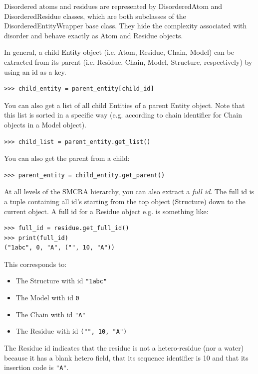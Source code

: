 Disordered atoms and residues are represented by DisorderedAtom and DisorderedResidue
classes, which are both subclasses of the DisorderedEntityWrapper base class.
They hide the complexity associated with disorder and behave exactly as Atom
and Residue objects.

In general, a child Entity object (i.e. Atom, Residue, Chain, Model) can be
extracted from its parent (i.e. Residue, Chain, Model, Structure, respectively)
by using an id as a key.

\begin{verbatim}
>>> child_entity = parent_entity[child_id]
\end{verbatim}

You can also get a list of all child Entities of a parent Entity object. Note
that this list is sorted in a specific way (e.g. according to chain identifier
for Chain objects in a Model object).

\begin{verbatim}
>>> child_list = parent_entity.get_list()
\end{verbatim}

You can also get the parent from a child:
\begin{verbatim}
>>> parent_entity = child_entity.get_parent()
\end{verbatim}

At all levels of the SMCRA hierarchy, you can also extract a \emph{full id}.
The full id is a tuple containing all id's starting from the top object (Structure)
down to the current object. A full id for a Residue object e.g. is something
like:

\begin{verbatim}
>>> full_id = residue.get_full_id()
>>> print(full_id)
("1abc", 0, "A", ("", 10, "A"))
\end{verbatim}

This corresponds to:

\begin{itemize}
\item The Structure with id \verb|"1abc"|
\item The Model with id \verb|0|
\item The Chain with id \verb|"A"|
\item The Residue with id \verb|("", 10, "A")|
\end{itemize}
The Residue id indicates that the residue is not a hetero-residue (nor a water)
because it has a blank hetero field, that its sequence identifier is 10 and
that its insertion code is \verb|"A"|.

